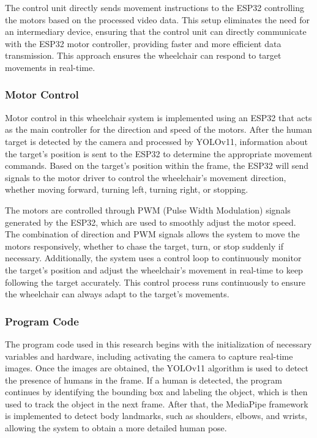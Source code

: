 The control unit directly sends movement instructions to the ESP32 controlling the motors based on the processed video data. This setup eliminates the need for an intermediary device, ensuring that the control unit can directly communicate with the ESP32 motor controller, providing faster and more efficient data transmission. This approach ensures the wheelchair can respond to target movements in real-time.

\vspace{5pt}
\subsubsection{Motor Control}
\label{subsubsec:motorcontrol}

Motor control in this wheelchair system is implemented using an ESP32 that acts as the main controller for the direction and speed of the motors. After the human target is detected by the camera and processed by YOLOv11, information about the target's position is sent to the ESP32 to determine the appropriate movement commands. Based on the target's position within the frame, the ESP32 will send signals to the motor driver to control the wheelchair's movement direction, whether moving forward, turning left, turning right, or stopping.

The motors are controlled through PWM (Pulse Width Modulation) signals generated by the ESP32, which are used to smoothly adjust the motor speed. The combination of direction and PWM signals allows the system to move the motors responsively, whether to chase the target, turn, or stop suddenly if necessary. Additionally, the system uses a control loop to continuously monitor the target's position and adjust the wheelchair's movement in real-time to keep following the target accurately. This control process runs continuously to ensure the wheelchair can always adapt to the target's movements.

\vspace{5pt}
\subsubsection{Program Code}
\label{subsubsec:programcode}

The program code used in this research begins with the initialization of necessary variables and hardware, including activating the camera to capture real-time images. Once the images are obtained, the YOLOv11 algorithm is used to detect the presence of humans in the frame. If a human is detected, the program continues by identifying the bounding box and labeling the object, which is then used to track the object in the next frame. After that, the MediaPipe framework is implemented to detect body landmarks, such as shoulders, elbows, and wrists, allowing the system to obtain a more detailed human pose.

